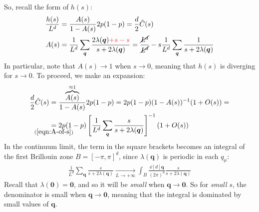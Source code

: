 \documentclass[../../main.tex]{subfiles}
\begin{document}
So, recall the form of $h(s)$:
\begin{align}\nonumber
    \frac{h(s)}{L^d}  &= \frac{A(s)}{1-A(s)}  2p(1-p) = \frac{d}{2} \hat{C}(s)\\
    A(s) &= \frac{1}{L^d} \sum_{\bm{q}} \frac{2 \lambda(\bm{q}) \textcolor{Red}{+s -s}}{s + 2 \lambda(\bm{q})} = \frac{\cancel{L^d}}{\cancel{L^d}}  - s \frac{1}{L^d} \sum_{\bm{q}} \frac{1}{s+ 2 \lambda(\bm{q})}  \label{eqn:A-of-s}
\end{align}
In particular, note that $A(s) \to 1$ when $s \to 0$, meaning that $h(s)$ is diverging for $s \to 0$. To proceed, we make an expansion:
\begin{align*}
    \frac{d}{2} \hat{C}(s) &= \frac{\overbrace{A(s)}^{\approx 1} }{1 - A(s)} 2p(1-p)  = 2p(1-p) (1 - A(s))^{-1} (1+ O(s)) =\\
    &\underset{\mathclap{(\ref{eqn:A-of-s})}}{=} 2p(1-p) \left[\frac{1}{L^d} \sum_{\bm{q}} \frac{s}{s + 2 \lambda(\bm{q})}  \right]^{-1} (1 + O(s))
\end{align*}
In the continuum limit, the term in the square brackets becomes an integral of the first Brillouin zone $B = [-\pi, \pi]^d$, since $\lambda(\bm{q})$ is periodic in each $q_\mu$:
\begin{align}\label{eqn:bracket-continuum}
    \frac{1}{L^d} \sum_{\bm{q}} \frac{s}{s+ 2\lambda(\bm{q})}   \xrightarrow[L \to +\infty]{}  \int_B \frac{\dd[d]{\bm{q}}}{(2\pi)^d} \frac{s}{s+ 2\lambda(\bm{q})} 
\end{align}
Recall that $\lambda(\bm{0}) = \bm{0}$, and so it will be \textit{small} when $\bm{q} \to \bm{0}$. So for \textit{small} $s$, the denominator is small when $\bm{q} \to \bm{0}$, meaning that the integral is dominated by small values of $\bm{q}$.
\end{document}
